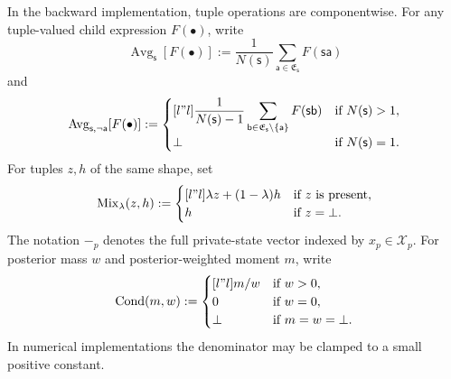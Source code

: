 \documentclass[12pt, a4paper]{article}
\begin{document}
In the backward implementation, tuple operations are componentwise.
For any tuple-valued child expression $F(\bullet)$, write
\[
  \operatorname{Avg}_{\mathsf{s}}[F(\bullet)]
  :=
  \frac{1}{N(\mathsf{s})}\sum_{\mathsf{a}\in\mathfrak{E}_{\mathsf{s}}}F(\mathsf{s}\mathsf{a})
\]
and
\[
  \operatorname{Avg}_{\mathsf{s},\neg\mathsf{a}}[F(\bullet)]
  :=
  \begin{cases}[l"l]
    \displaystyle
    \frac{1}{N(\mathsf{s})-1}
    \sum_{\mathsf{b}\in\mathfrak{E}_{\mathsf{s}}\setminus\{\mathsf{a}\}}F(\mathsf{s}\mathsf{b})
    & \textnormal{if }N(\mathsf{s})>1,\\
    \bot & \textnormal{if }N(\mathsf{s})=1.
  \end{cases}
\]
For tuples $z,h$ of the same shape, set
\[
  \operatorname{Mix}_{\lambda}(z,h)
  :=
  \begin{cases}[l"l]
    \lambda z+(1-\lambda)h & \textnormal{if }z\textnormal{ is present},\\
    h & \textnormal{if }z=\bot.
  \end{cases}
\]
The notation $-_p$ denotes the full private-state vector indexed by $x_p\in\mathcal X_p$.
For posterior mass $w$ and posterior-weighted moment $m$, write
\[
  \operatorname{Cond}(m,w):=
  \begin{cases}[l"l]
    m/w & \textnormal{if }w>0,\\
    0 & \textnormal{if }w=0,\\
    \bot & \textnormal{if }m=w=\bot.
  \end{cases}
\]
In numerical implementations the denominator may be clamped to a small positive constant.
\end{document}
